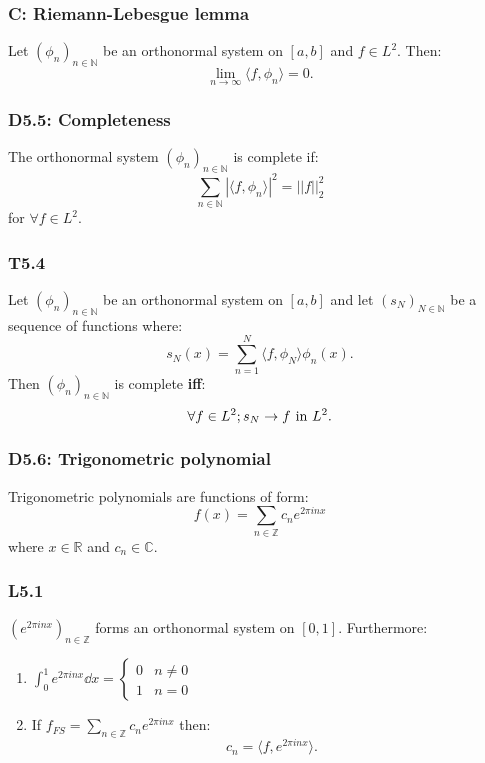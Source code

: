 \documentclass{article}
\begin{document}
\begin{multicols*}{3}
\subsubsection*{C: Riemann-Lebesgue lemma}
Let $(\phi_n)_{n\in\mathbb{N}}$ be an
orthonormal system on $[a,b]$ and $f\in L^2$.
Then:
$$\lim_{n\rightarrow\infty}\langle f,\phi_n\rangle=0.$$

\subsubsection*{D5.5: Completeness}
The orthonormal system $(\phi_n)_{n\in\mathbb{N}}$ 
is complete if:
$$\sum_{n\in\mathbb{N}}|
\langle f,\phi_n\rangle|^2=||f||_2^2$$
for $\forall f\in L^2$.

\subsubsection*{T5.4}
Let $(\phi_n)_{n\in\mathbb{N}}$ be an
orthonormal system on $[a,b]$ and let
$(s_N)_{N\in\mathbb{N}}$ be a sequence of functions
where:
$$s_N(x)=\sum_{n=1}^{N}
\langle f,\phi_N\rangle\phi_n(x).$$
Then $(\phi_n)_{n\in\mathbb{N}}$
is complete \textbf{if{}f}:
$$\forall f\in L^2; s_N\rightarrow f
\hspace{0.05in}\text{in $L^2$}.$$

\subsubsection*{D5.6: Trigonometric polynomial}
Trigonometric polynomials are functions of form:
$$f(x)=\sum_{n\in\mathbb{Z}}
c_n e^{2\pi inx}$$
where $x\in\mathbb{R}$ and $c_n\in\mathbb{C}$.

\subsubsection*{L5.1}
$(e^{2\pi inx})_{n\in\mathbb{Z}}$ forms
an orthonormal system on $[0,1]$. Furthermore:
\begin{enumerate}
    \item $\displaystyle
    \int_{0}^{1}e^{2\pi inx}\dd x
    =\left\{\begin{array}{ll}
        0 & n\neq0 \\
        1 & n=0
    \end{array}\right.$

    \item If
    $\displaystyle f_{FS}
    =\sum_{n\in\mathbb{Z}}c_n e^{2\pi inx}$ then:
    $$c_n=\langle f,e^{2\pi inx}\rangle.$$
\end{enumerate}


\end{multicols*}
\end{document}
